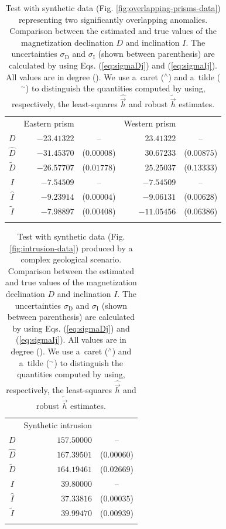 \documentclass[journal abbreviation, npg]{copernicus}
\begin{document}

\begin{table}[t]
\caption{Test with synthetic data (Fig. \ref{fig:overlapping-prisms-data})
representing two significantly overlapping anomalies. Comparison between 
the estimated and
true values of the magnetization declination $D$ and inclination $I$. The
uncertainties $\sigma_\mathrm{D}$ and $\sigma_\mathrm{I}$ (shown between 
parenthesis) are calculated by
using Eqs. (\ref{eq:sigmaDj}) and (\ref{eq:sigmaIj}). All values are in
degree ({\degree}). We use a~caret ($^{\wedge}$) and a~tilde ($^{\sim}$) to
distinguish the quantities computed by using, respectively, the least-squares
$\hat{\vec{h}}$ and robust $\tilde{\vec{h}}$ estimates.}
\begin{tabular}{crcrc}
\tophline
&Eastern prism & & Western prism & \\
\middlehline
$D$ &$-23.41322$ & -- &$23.41322$ & -- \\
$\hat{D}$ &$-31.45370$ &($0.00008$) &$30.67233$ &($0.00875$) \\
$\tilde{D}$ &$-26.57707$ &($0.01778$) &$25.25037$ &($0.13333$) \\
\middlehline
$I$ &$-7.54509$ & -- &$-7.54509$ & -- \\
$\hat{I}$ &$-9.23914$ &($0.00004$) &$-9.06131$ &($0.00628$) \\
$\tilde{I}$ &$-7.98897$ &($0.00408$) &$-11.05456$ &($0.06386$) \\
\bottomhline
\end{tabular}
\label{tab:overlapping-prisms-results}
\end{table}

\begin{table}[t]
\caption{Test with synthetic data (Fig. \ref{fig:intrusion-data})
produced by a complex geological scenario. Comparison between 
the estimated and
true values of the magnetization declination $D$ and inclination $I$. The
uncertainties $\sigma_\mathrm{D}$ and $\sigma_\mathrm{I}$ (shown between 
parenthesis) are calculated by
using Eqs. (\ref{eq:sigmaDj}) and (\ref{eq:sigmaIj}). All values are in
degree ({\degree}). We use a~caret ($^{\wedge}$) and a~tilde ($^{\sim}$) to
distinguish the quantities computed by using, respectively, the least-squares
$\hat{\vec{h}}$ and robust $\tilde{\vec{h}}$ estimates.}
\begin{tabular}{crc}
\tophline
&Synthetic intrusion \\
\middlehline
$D$ &$157.50000$ & --\\
$\hat{D}$ &$167.39501$ &($0.00060$) \\
$\tilde{D}$ &$164.19461$ &($0.02669$) \\
\middlehline
$I$ &$39.80000$ & -- \\
$\hat{I}$ &$37.33816$ &($0.00035$) \\
$\tilde{I}$ &$39.99470$ &($0.00939$) \\
\bottomhline
\end{tabular}
\label{tab:intrusion-results}
\end{table}
\end{document}
